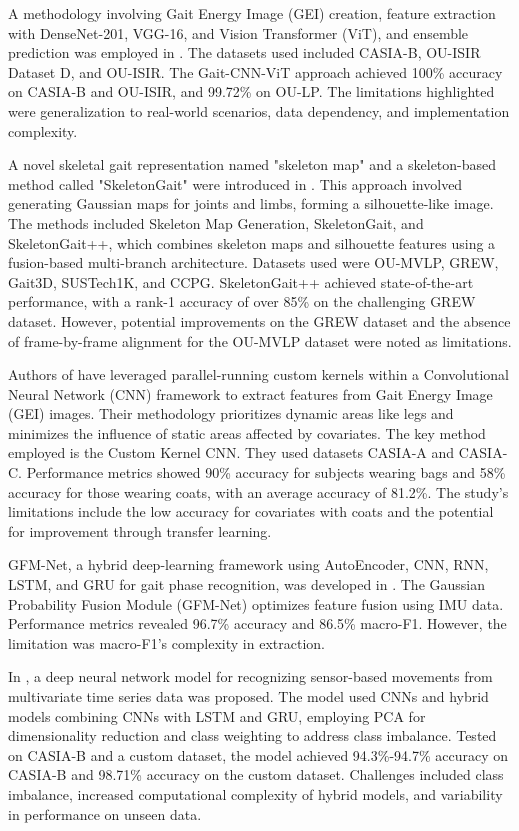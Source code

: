 \documentclass[a4paper]{article}
\begin{document}
A methodology involving Gait Energy Image (GEI) creation, feature extraction with DenseNet-201, VGG-16, and Vision Transformer (ViT), and ensemble prediction was employed in \cite{14}. The datasets used included CASIA-B, OU-ISIR Dataset D, and OU-ISIR. The Gait-CNN-ViT approach achieved 100\% accuracy on CASIA-B and OU-ISIR, and 99.72\% on OU-LP. The limitations highlighted were generalization to real-world scenarios, data dependency, and implementation complexity.

A novel skeletal gait representation named "skeleton map" and a skeleton-based method called "SkeletonGait" were introduced in \cite{15}. This approach involved generating Gaussian maps for joints and limbs, forming a silhouette-like image. The methods included Skeleton Map Generation, SkeletonGait, and SkeletonGait++, which combines skeleton maps and silhouette features using a fusion-based multi-branch architecture. Datasets used were OU-MVLP, GREW, Gait3D, SUSTech1K, and CCPG. SkeletonGait++ achieved state-of-the-art performance, with a rank-1 accuracy of over 85\% on the challenging GREW dataset. However, potential improvements on the GREW dataset and the absence of frame-by-frame alignment for the OU-MVLP dataset were noted as limitations.

Authors of \cite{16} have leveraged parallel-running custom kernels within a Convolutional Neural Network (CNN) framework to extract features from Gait Energy Image (GEI) images. Their methodology prioritizes dynamic areas like legs and minimizes the influence of static areas affected by covariates. The key method employed is the Custom Kernel CNN. They used datasets CASIA-A and CASIA-C. Performance metrics showed 90\% accuracy for subjects wearing bags and 58\% accuracy for those wearing coats, with an average accuracy of 81.2\%. The study's limitations include the low accuracy for covariates with coats and the potential for improvement through transfer learning.

GFM-Net, a hybrid deep-learning framework using AutoEncoder, CNN, RNN, LSTM, and GRU for gait phase recognition, was developed in \cite{17}. The Gaussian Probability Fusion Module (GFM-Net) optimizes feature fusion using IMU data. Performance metrics revealed 96.7\% accuracy and 86.5\% macro-F1. However, the limitation was macro-F1's complexity in extraction.

In \cite{18}, a deep neural network model for recognizing sensor-based movements from multivariate time series data was proposed. The model used CNNs and hybrid models combining CNNs with LSTM and GRU, employing PCA for dimensionality reduction and class weighting to address class imbalance. Tested on CASIA-B and a custom dataset, the model achieved 94.3\%-94.7\% accuracy on CASIA-B and 98.71\% accuracy on the custom dataset. Challenges included class imbalance, increased computational complexity of hybrid models, and variability in performance on unseen data.
\end{document}
